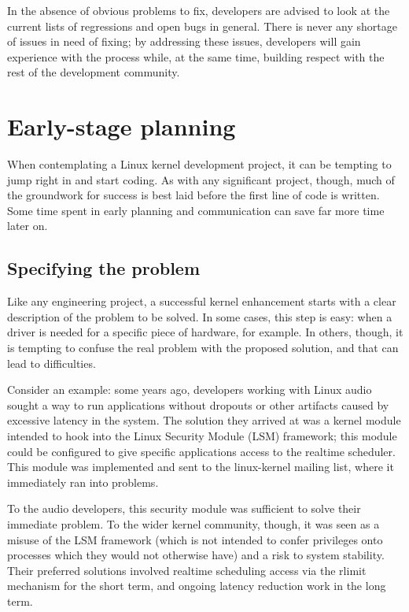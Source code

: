 \documentclass[a4paper,8pt,english]{sphinxmanual}
\begin{document}
In the absence of obvious problems to fix, developers are advised to look
at the current lists of regressions and open bugs in general.  There is
never any shortage of issues in need of fixing; by addressing these issues,
developers will gain experience with the process while, at the same time,
building respect with the rest of the development community.


\section{Early-stage planning}
\label{process/3.Early-stage:development-early-stage}\label{process/3.Early-stage::doc}\label{process/3.Early-stage:early-stage-planning}
When contemplating a Linux kernel development project, it can be tempting
to jump right in and start coding.  As with any significant project,
though, much of the groundwork for success is best laid before the first
line of code is written.  Some time spent in early planning and
communication can save far more time later on.


\subsection{Specifying the problem}
\label{process/3.Early-stage:specifying-the-problem}
Like any engineering project, a successful kernel enhancement starts with a
clear description of the problem to be solved.  In some cases, this step is
easy: when a driver is needed for a specific piece of hardware, for
example.  In others, though, it is tempting to confuse the real problem
with the proposed solution, and that can lead to difficulties.

Consider an example: some years ago, developers working with Linux audio
sought a way to run applications without dropouts or other artifacts caused
by excessive latency in the system.  The solution they arrived at was a
kernel module intended to hook into the Linux Security Module (LSM)
framework; this module could be configured to give specific applications
access to the realtime scheduler.  This module was implemented and sent to
the linux-kernel mailing list, where it immediately ran into problems.

To the audio developers, this security module was sufficient to solve their
immediate problem.  To the wider kernel community, though, it was seen as a
misuse of the LSM framework (which is not intended to confer privileges
onto processes which they would not otherwise have) and a risk to system
stability.  Their preferred solutions involved realtime scheduling access
via the rlimit mechanism for the short term, and ongoing latency reduction
work in the long term.
\end{document}
